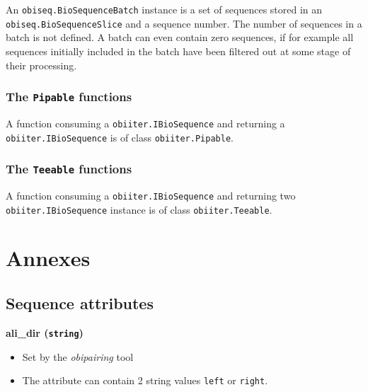 \documentclass[
  letterpaper,
  DIV=11,
  numbers=noendperiod]{scrreprt}
\providecommand{\tightlist}{%
  \setlength{\itemsep}{0pt}\setlength{\parskip}{0pt}}\usepackage{longtable,booktabs,array}
\begin{document}
An \texttt{obiseq.BioSequenceBatch} instance is a set of sequences
stored in an \texttt{obiseq.BioSequenceSlice} and a sequence number. The
number of sequences in a batch is not defined. A batch can even contain
zero sequences, if for example all sequences initially included in the
batch have been filtered out at some stage of their processing.

\hypertarget{the-pipable-functions}{%
\subsection*{\texorpdfstring{The \texttt{Pipable}
functions}{The Pipable functions}}\label{the-pipable-functions}}

A function consuming a \texttt{obiiter.IBioSequence} and returning a
\texttt{obiiter.IBioSequence} is of class \texttt{obiiter.Pipable}.

\hypertarget{the-teeable-functions}{%
\subsection*{\texorpdfstring{The \texttt{Teeable}
functions}{The Teeable functions}}\label{the-teeable-functions}}

A function consuming a \texttt{obiiter.IBioSequence} and returning two
\texttt{obiiter.IBioSequence} instance is of class
\texttt{obiiter.Teeable}.

\appendix
{}

\hypertarget{annexes}{%
\chapter{Annexes}\label{annexes}}

\hypertarget{sequence-attributes}{%
\section{Sequence attributes}\label{sequence-attributes}}

\textbf{ali\_dir (\texttt{string})}

\begin{itemize}
\tightlist
\item
  Set by the \emph{obipairing} tool
\item
  The attribute can contain 2 string values \texttt{left} or
  \texttt{right}.
\end{itemize}
\end{document}
